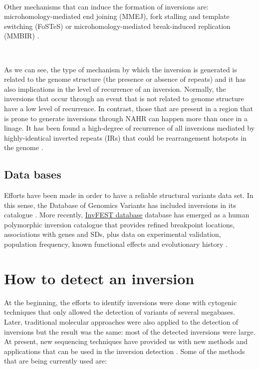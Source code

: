 \documentclass[a4paper,12pt]{article}
\begin{document}
\

Other mechanisms that can induce the formation of inversions are: microhomology-mediated end joining (MMEJ), fork stalling and template switching (FoSTeS) or microhomology-mediated break-induced replication (MMBIR) \cite{vicente-salvador_detailed_2017}. 

\

As we can see, the type of mechanism by which the inversion is generated is related to the genome structure (the presence or absence of repeats) and it has also implications in the level of recurrence of an inversion. Normally, the inversions that occur through an event that is not related to genome structure have a low level of recurrence. In contrast, those that are present in a region that is prone to generate inversions through NAHR can happen more than once in a linage. It has been found a high-degree of recurrence of all inversions mediated by highly-identical inverted repeats (IRs) that could be rearrangement hotspots in the genome \cite{giner-delgado_evolutionary_2019}. 

\subsection{Data bases}
Efforts have been made in order to have a reliable structural variants data set. In this sense, the Database of Genomics Variants has included inversions in its catalogue \cite{puig_human_2015}. More recently, \href{http://invfestdb.uab.cat/}{InvFEST database} database has emerged as a human polymorphic inversion catalogue that provides refined breakpoint locations, associations with genes and SDs, plus data on experimental validation, population frequency, known functional effects and evolutionary history \cite{martinez-fundichely_invfest_2014}.


\section{How to detect an inversion}

At the beginning, the efforts to identify inversions were done with cytogenic techniques that only allowed the detection of variants of several megabases. Later, traditional molecular approaches were also applied to the detection of inversions but the result was the same: most of the detected inversions were large. At present, new sequencing techniques have provided us with new methods and applications that can be used in the inversion detection \cite{puig_human_2015}. 
Some of the methods that are being currently used are:
\end{document}
